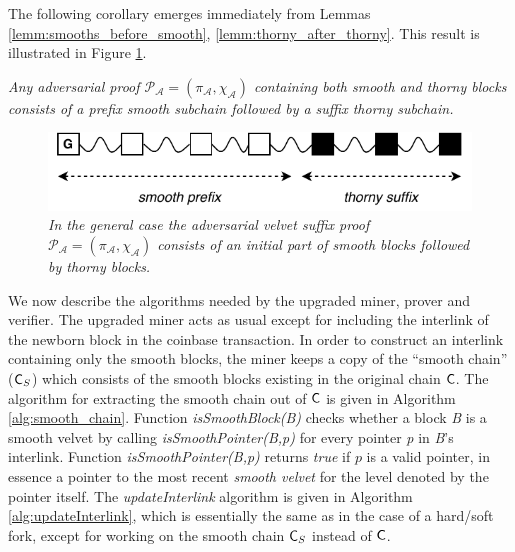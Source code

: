 The following corollary emerges immediately from Lemmas \ref{lemm:smooths_before_smooth}, \ref{lemm:thorny_after_thorny}. This result is illustrated in Figure \ref{fig:adversarial_velvet_proof}.

\begin{corollary}
	\textit{Any adversarial proof $\mathcal{P_A} = (\pi_\mathcal{A}, \chi_\mathcal{A})$ containing both smooth and thorny blocks consists of a prefix smooth subchain followed by a suffix thorny subchain.}
	\label{cor:adversarial_proof_scheme}
\end{corollary}

\begin{figure}[h!]
	\begin{center}
		\includegraphics[scale=0.75]{figures/adversarial_velvet_proof.pdf}
	\end{center}
	\caption{\textit{In the general case the adversarial velvet suffix proof $\mathcal{P_A} = (\pi_\mathcal{A}, \chi_\mathcal{A})$ consists of an initial part of smooth blocks followed by thorny blocks.}}
	\label{fig:adversarial_velvet_proof}
\end{figure}
We now describe the algorithms needed by the upgraded miner, prover and verifier. The upgraded miner acts as usual except for including the interlink of the newborn block in the coinbase transaction. In order to construct an interlink containing only the smooth blocks, the miner keeps a copy of the ``smooth chain'' ($\mathsf{C}_S$) which consists of the smooth blocks existing in the original chain $\mathsf{C}$. The algorithm for extracting the smooth chain out of $\mathsf{C}$ is given in Algorithm \ref{alg:smooth_chain}. Function \textit{isSmoothBlock(B)} checks whether a block \textit{B} is a smooth velvet by calling \textit{isSmoothPointer(B,p)} for every pointer \textit{p} in \textit{B}'s interlink. Function \textit{isSmoothPointer(B,p)} returns \emph{true} if $p$ is a valid pointer, in essence a pointer to the most recent \emph{smooth velvet} for the level denoted by the pointer itself. The \textit{updateInterlink} algorithm is given in Algorithm \ref{alg:updateInterlink}, which is essentially the same as in the case of a hard/soft fork, except for working on the smooth chain $\mathsf{C}_S$ instead of $\mathsf{C}$.

